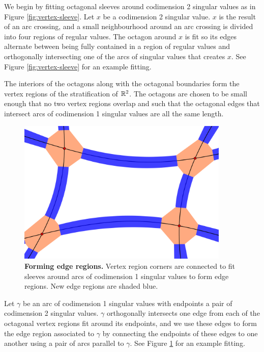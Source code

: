 We begin by fitting octagonal sleeves around codimension 2 singular values as in Figure \ref{fig:vertex-sleeve}.
Let $x$ be a codimension 2 singular value.
$x$ is the result of an arc crossing, and a small neighbourhood around an arc crossing is divided into four regions of regular values.
The octagon around $x$ is fit so its edges alternate between being fully contained in a region of regular values and orthogonally intersecting one of the arcs of singular values that creates $x$.
See Figure \ref{fig:vertex-sleeve} for an example fitting.

The interiors of the octagons along with the octagonal boundaries form the vertex regions of the stratification of $\mathbb{R}^2$.
The octagons are chosen to be small enough that no two vertex regions overlap and such that the octagonal edges that intersect arcs of codimension 1 singular values are all the same length.

\begin{figure}[h!]
	\centering
	\includegraphics[width=0.9\textwidth]{figures/edge-sleeve.png}
	\caption{
		\textbf{Forming edge regions.}
		Vertex region corners are connected to fit sleeves around arcs of codimension 1 singular values to form edge regions.
		New edge regions are shaded blue.
	}
	\label{fig:edge-sleeve}
\end{figure}

Let $\gamma$ be an arc of codimension 1 singular values with endpoints a pair of codimension 2 singular values.
$\gamma$ orthogonally intersects one edge from each of the octagonal vertex regions fit around its endpoints, and we use these edges to form the edge region associated to $\gamma$ by connecting the endpoints of these edges to one another using a pair of arcs parallel to $\gamma$.
See Figure \ref{fig:edge-sleeve} for an example fitting.

